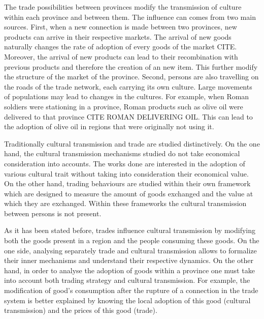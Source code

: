 \documentclass{wscpaperproc}
\begin{document}
The trade possibilities between provinces modify the transmission of culture within each province and between them. The influence can comes from two main sources. First, when a new connection is made between two provinces, new products can arrive in their respective markets. The arrival of new goods naturally changes the rate of adoption of every goods of the market CITE. Moreover, the arrival of new products can lead to their recombination with previous products and therefore the creation of an new item. This further modify the structure of the market of the province. Second, persons are also travelling on the roads of the trade network, each carrying its own culture. Large movements of populations may lead to changes in the cultures. For example, when Roman soldiers were stationing in a province, Roman products such as olive oil were delivered to that province CITE ROMAN DELIVERING OIL. This can lead to the adoption of olive oil in regions that were originally not using it.


Traditionally cultural transmission and trade are studied distinctively.  On the one hand, the cultural transmission mechanisms studied do not take economical consideration into accounts. The works done are interested in the adoption of various cultural trait without taking into consideration their economical value. On the other hand, trading behaviours are studied within their own framework which are designed to measure the amount of goods exchanged and the value at which they are exchanged. Within these frameworks the cultural transmission between persons is not present.


As it has been stated before, trades influence cultural transmission by modifying both the goods present in a region and the people consuming these goods. On the one side, analysing separately trade and cultural transmission allows to formalize their inner mechanisms and understand their respective dynamics. On the other hand, in order to analyse the adoption of goods within a province one must take into account both trading strategy and cultural transmission. For example, the modification of good's consumption after the rupture of a connection in the trade system is better explained by knowing the local adoption of this good (cultural transmission) and the prices of this good (trade).
\end{document}
